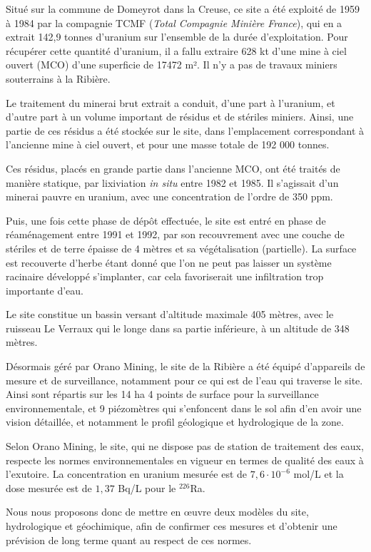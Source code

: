 \documentclass{article}
\begin{document}
Situé sur la commune de Domeyrot dans la Creuse, ce site a été exploité de 1959 à 1984 par la compagnie TCMF (\emph{Total Compagnie Minière France}), qui en a extrait 142,9 tonnes d’uranium sur l’ensemble de la durée d’exploitation. Pour récupérer cette quantité d’uranium, il a fallu extraire 628 kt d’une mine à ciel ouvert (MCO) d’une superficie de 17472 m². Il n’y a pas de travaux miniers souterrains à la Ribière.

Le traitement du minerai brut extrait a conduit, d’une part à l’uranium, et d’autre part à un volume important de résidus et de stériles miniers. Ainsi, une partie de ces résidus a été stockée sur le site, dans l’emplacement correspondant à l'ancienne mine à ciel ouvert, et pour une masse totale de 192 000 tonnes.

Ces résidus, placés en grande partie dans l’ancienne MCO, ont été traités de manière statique, par lixiviation \textit{in situ} entre 1982 et 1985. Il s'agissait d’un minerai pauvre en uranium, avec une concentration de l’ordre de 350 ppm. 

Puis, une fois cette phase de dépôt effectuée, le site est entré en phase de réaménagement entre 1991 et 1992, par son recouvrement avec une couche de stériles et de terre épaisse de 4 mètres et sa végétalisation (partielle). La surface est recouverte d’herbe étant donné que l’on ne peut pas laisser un système racinaire développé s’implanter, car cela favoriserait une infiltration trop importante d’eau.

Le site constitue un bassin versant d’altitude maximale 405 mètres, avec le ruisseau Le Verraux qui le longe dans sa partie inférieure, à un altitude de 348 mètres.

Désormais géré par Orano Mining, le site de la Ribière a été équipé d'appareils de mesure et de surveillance, notamment pour ce qui est de l’eau qui traverse le site. Ainsi sont répartis sur les 14 ha 4 points de surface pour la surveillance environnementale, et 9 piézomètres qui s’enfoncent dans le sol afin d’en avoir une vision détaillée, et notamment le profil géologique et hydrologique de la zone.

Selon Orano Mining, le site, qui ne dispose pas de station de traitement des eaux, respecte les normes environnementales en vigueur en termes de qualité des eaux à l’exutoire. La concentration en uranium mesurée est de $7,6 \cdot 10^{-6} $ mol/L et la dose mesurée est de $1,37$ Bq/L pour le $^{226}$Ra.

Nous nous proposons donc de mettre en œuvre deux modèles du site, hydrologique et géochimique, afin de confirmer ces mesures et d’obtenir une prévision de long terme quant au respect de ces normes. 
\end{document}
